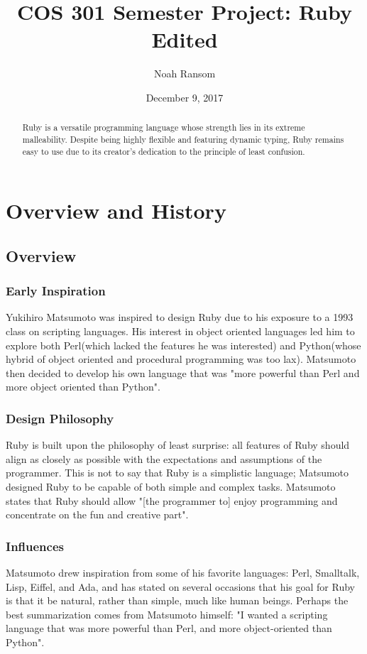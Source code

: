 \documentclass[12pt]{article}
\title{COS 301 Semester Project: Ruby \\
    \large Edited}
\author{Noah Ransom}
\date{December 9, 2017}
\begin{document}
\maketitle
\pagebreak
\tableofcontents

\pagebreak
\begin{abstract}
    Ruby is a versatile programming language whose strength lies in its extreme malleability. Despite being highly flexible and featuring dynamic typing, Ruby remains easy to use due to its creator's dedication to the principle of least confusion.
\end{abstract}
\section{Overview and History}
\subsection{Overview}

\subsubsection{Early Inspiration}
Yukihiro Matsumoto was inspired to design Ruby due to his exposure to a 1993 class on scripting languages. His interest in object oriented languages led him to explore both Perl(which lacked the features he was interested) and Python(whose hybrid of object oriented and procedural programming was too lax)\cite{rubyinterview}. Matsumoto then decided to develop his own language that was "more powerful than Perl and more object oriented than Python"\cite{rubyinterview}.

\subsubsection{Design Philosophy}
Ruby is built upon the philosophy of least surprise: all features of Ruby should align as closely as possible with the expectations and assumptions of the programmer\cite{rubyinterview}. This is not to say that Ruby is a simplistic language; Matsumoto designed Ruby to be capable of both simple and complex tasks. Matsumoto states that Ruby should allow "[the programmer to] enjoy programming and concentrate on the fun and creative part"\cite{rubyinterview}. 

\subsubsection{Influences}
Matsumoto drew inspiration from some of his favorite languages: Perl, Smalltalk, Lisp, Eiffel, and Ada, and has stated on several occasions that his goal for Ruby is that it be natural, rather than simple, much like human beings\cite{generalRb}. Perhaps the best summarization comes from Matsumoto himself: "I wanted a scripting language that was more powerful than Perl, and more object-oriented than Python"\cite{rubyinterview}. 
\end{document}
